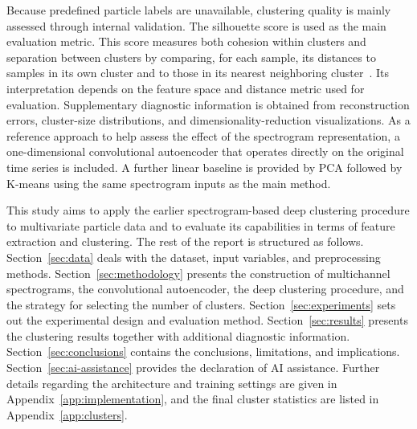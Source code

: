 Because predefined particle labels are unavailable, clustering quality is mainly assessed through internal validation. The silhouette score is used as the main evaluation metric. This score measures both cohesion within clusters and separation between clusters by comparing, for each sample, its distances to samples in its own cluster and to those in its nearest neighboring cluster~\cite{rousseeuw1987}. Its interpretation depends on the feature space and distance metric used for evaluation. Supplementary diagnostic information is obtained from reconstruction errors, cluster-size distributions, and dimensionality-reduction visualizations. As a reference approach to help assess the effect of the spectrogram representation, a one-dimensional convolutional autoencoder that operates directly on the original time series is included. A further linear baseline is provided by PCA followed by K-means using the same spectrogram inputs as the main method.

This study aims to apply the earlier spectrogram-based deep clustering procedure to multivariate particle data and to evaluate its capabilities in terms of feature extraction and clustering. The rest of the report is structured as follows. Section~\ref{sec:data} deals with the dataset, input variables, and preprocessing methods. Section~\ref{sec:methodology} presents the construction of multichannel spectrograms, the convolutional autoencoder, the deep clustering procedure, and the strategy for selecting the number of clusters. Section~\ref{sec:experiments} sets out the experimental design and evaluation method. Section~\ref{sec:results} presents the clustering results together with additional diagnostic information. Section~\ref{sec:conclusions} contains the conclusions, limitations, and implications. Section~\ref{sec:ai-assistance} provides the declaration of AI assistance. Further details regarding the architecture and training settings are given in Appendix~\ref{app:implementation}, and the final cluster statistics are listed in Appendix~\ref{app:clusters}.
